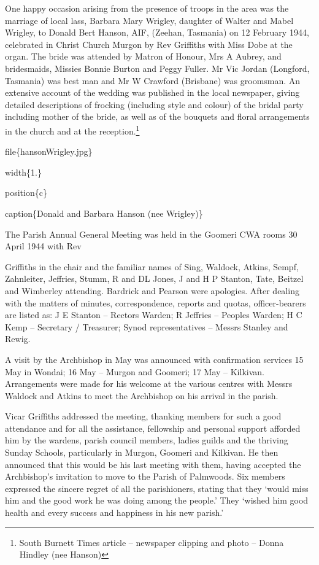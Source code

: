 One happy occasion arising from the presence of troops in the area was the marriage of local lass, Barbara Mary Wrigley, daughter of Walter and Mabel Wrigley, to Donald Bert Hanson, AIF, (Zeehan, Tasmania) on 12 February 1944, celebrated in Christ Church Murgon by Rev Griffiths with Miss Dobe at the organ. The bride was attended by Matron of Honour, Mrs A Aubrey, and bridesmaids, Missies Bonnie Burton and Peggy Fuller. Mr Vic Jordan (Longford, Tasmania) was best man and Mr W Crawford (Brisbane) was groomsman. An extensive account of the wedding was published in the local newspaper, giving detailed descriptions of frocking (including style and colour) of the bridal party including mother of the bride, as well as of the bouquets and floral arrangements in the church and at the reception.\footnote{South Burnett Times article -- newspaper clipping and photo -- Donna Hindley (nee Hanson)}

file\{hansonWrigley.jpg\}

width\{1.\}

position\{c\}

caption\{Donald and Barbara Hanson (nee Wrigley)\}

The Parish Annual General Meeting was held in the Goomeri CWA rooms 30 April 1944 with Rev

Griffiths in the chair and the familiar names of Sing, Waldock, Atkins, Sempf, Zahnleiter, Jeffries, Stumm, R and DL Jones, J and H P Stanton, Tate, Beitzel and Wimberley attending. Bardrick and Pearson were apologies. After dealing with the matters of minutes, correspondence, reports and quotas, officer-bearers are listed as: J E Stanton -- Rectors Warden; R Jeffries -- Peoples Warden; H C Kemp -- Secretary / Treasurer; Synod representatives -- Messrs Stanley and Rewig.

A visit by the Archbishop in May was announced with confirmation services 15 May in Wondai; 16 May -- Murgon and Goomeri; 17 May -- Kilkivan. Arrangements were made for his welcome at the various centres with Messrs Waldock and Atkins to meet the Archbishop on his arrival in the parish.

Vicar Griffiths addressed the meeting, thanking members for such a good attendance and for all the assistance, fellowship and personal support afforded him by the wardens, parish council members, ladies guilds and the thriving Sunday Schools, particularly in Murgon, Goomeri and Kilkivan. He then announced that this would be his last meeting with them, having accepted the Archbishop's invitation to move to the Parish of Palmwoods. Six members expressed the sincere regret of all the parishioners, stating that they `would miss him and the good work he was doing among the people.' They `wished him good health and every success and happiness in his new parish.'

